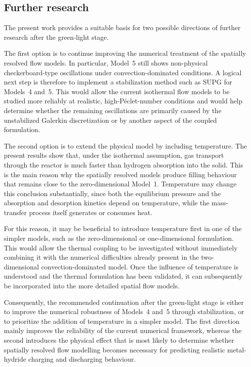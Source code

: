 \subsection{Further research}

The present work provides a suitable basis for two possible directions of further research after the green-light stage.

The first option is to continue improving the numerical treatment of the spatially resolved flow models. In particular, Model~5 still shows non-physical checkerboard-type oscillations under convection-dominated conditions. A logical next step is therefore to implement a stabilization method such as SUPG for Models~4 and~5. This would allow the current isothermal flow models to be studied more reliably at realistic, high-P\'eclet-number conditions and would help determine whether the remaining oscillations are primarily caused by the unstabilized Galerkin discretization or by another aspect of the coupled formulation.

The second option is to extend the physical model by including temperature. The present results show that, under the isothermal assumption, gas transport through the reactor is much faster than hydrogen absorption into the solid. This is the main reason why the spatially resolved models produce filling behaviour that remains close to the zero-dimensional Model~1. Temperature may change this conclusion substantially, since both the equilibrium pressure and the absorption and desorption kinetics depend on temperature, while the mass-transfer process itself generates or consumes heat.

For this reason, it may be beneficial to introduce temperature first in one of the simpler models, such as the zero-dimensional or one-dimensional formulation. This would allow the thermal coupling to be investigated without immediately combining it with the numerical difficulties already present in the two-dimensional convection-dominated model. Once the influence of temperature is understood and the thermal formulation has been validated, it can subsequently be incorporated into the more detailed spatial flow models.

Consequently, the recommended continuation after the green-light stage is either to improve the numerical robustness of Models~4 and~5 through stabilization, or to prioritize the addition of temperature in a simpler model. The first direction mainly improves the reliability of the current numerical framework, whereas the second introduces the physical effect that is most likely to determine whether spatially resolved flow modelling becomes necessary for predicting realistic metal-hydride charging and discharging behaviour.

